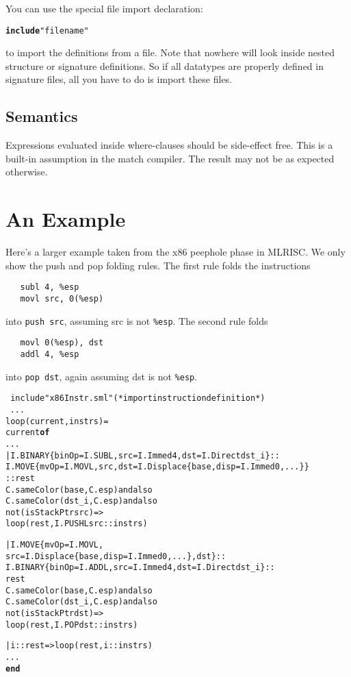 \documentclass{article}
\newcommand{\nowhere}{{\sf nowhere}}
\newcommand{\END}{{\bf end}}
\newcommand{\OF}{{\bf of}}
\begin{document}
You can use the special file import declaration:
\begin{alltt}
  {\bf include} "filename"
\end{alltt}
to import the definitions from a file.  Note that \nowhere{} will look 
inside nested structure or signature definitions.  So if all datatypes are
properly defined in signature files, all you have to do is import these
files.

\subsection{Semantics}
   Expressions evaluated inside where-clauses should be side-effect free.
This is a built-in assumption in the match compiler.  The result may
not be as expected otherwise.

\section{An Example}
Here's a larger example taken from the x86 peephole phase in MLRISC.
We only show the push and pop folding rules.  The first rule
folds the instructions 
\begin{verbatim}
   subl 4, %esp
   movl src, 0(%esp)
\end{verbatim}
into \verb|push src|, assuming src is not \verb|%esp|. 
The second rule folds
\begin{verbatim}
   movl 0(%esp), dst
   addl 4, %esp
\end{verbatim}
into \verb|pop dst|, again assuming dst is not \verb|%esp|.
\begin{alltt}
\LOCAL\ 
   include "x86Instr.sml" (* import instruction definition *)
\IN\ 
   {\sl ...}
   \FUN loop(current, instrs) =
       \CASE current \OF
         {\sl ...}
      | I.BINARY\{binOp=I.SUBL, src=I.Immed 4, dst=I.Direct dst_i\}:: 
        I.MOVE\{mvOp=I.MOVL,src,dst=I.Displace\{base,disp=I.Immed 0,...\}\}
        ::rest 
           \WHERE C.sameColor(base, C.esp) andalso
                  C.sameColor(dst_i, C.esp) andalso
                  not(isStackPtr src) =>
           loop(rest, I.PUSHL src::instrs)
               
      | I.MOVE\{mvOp=I.MOVL, 
              src=I.Displace\{base, disp=I.Immed 0, ...\}, dst\}::
        I.BINARY\{binOp=I.ADDL, src=I.Immed 4, dst=I.Direct dst_i\}:: 
        rest 
           \WHERE C.sameColor(base, C.esp) andalso
                 C.sameColor(dst_i,C.esp) andalso
                 not(isStackPtr dst) =>
           loop(rest, I.POP dst::instrs)

     | i::rest => loop(rest, i::instrs)
     {\sl ...}
\END
\end{alltt}
\end{document}
